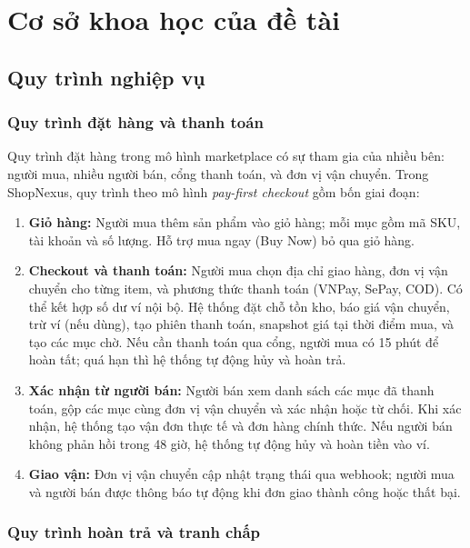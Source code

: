 \chapter{Cơ sở khoa học của đề tài}

\section{Quy trình nghiệp vụ}

\subsection{Quy trình đặt hàng và thanh toán}

Quy trình đặt hàng trong mô hình marketplace có sự tham gia của nhiều bên: người mua, nhiều người bán, cổng thanh toán, và đơn vị vận chuyển. Trong ShopNexus, quy trình theo mô hình \textit{pay-first checkout} gồm bốn giai đoạn:

\begin{enumerate}
    \item \textbf{Giỏ hàng:} Người mua thêm sản phẩm vào giỏ hàng; mỗi mục gồm mã SKU, tài khoản và số lượng. Hỗ trợ mua ngay (Buy Now) bỏ qua giỏ hàng.
    \item \textbf{Checkout và thanh toán:} Người mua chọn địa chỉ giao hàng, đơn vị vận chuyển cho từng item, và phương thức thanh toán (VNPay, SePay, COD). Có thể kết hợp số dư ví nội bộ. Hệ thống đặt chỗ tồn kho, báo giá vận chuyển, trừ ví (nếu dùng), tạo phiên thanh toán, snapshot giá tại thời điểm mua, và tạo các mục chờ. Nếu cần thanh toán qua cổng, người mua có 15 phút để hoàn tất; quá hạn thì hệ thống tự động hủy và hoàn trả.
    \item \textbf{Xác nhận từ người bán:} Người bán xem danh sách các mục đã thanh toán, gộp các mục cùng đơn vị vận chuyển và xác nhận hoặc từ chối. Khi xác nhận, hệ thống tạo vận đơn thực tế và đơn hàng chính thức. Nếu người bán không phản hồi trong 48 giờ, hệ thống tự động hủy và hoàn tiền vào ví.
    \item \textbf{Giao vận:} Đơn vị vận chuyển cập nhật trạng thái qua webhook; người mua và người bán được thông báo tự động khi đơn giao thành công hoặc thất bại.
\end{enumerate}

\subsection{Quy trình hoàn trả và tranh chấp}

